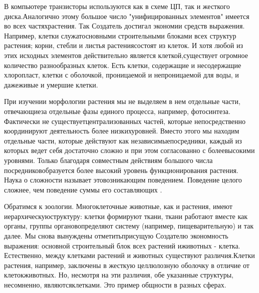 \documentclass[10pt]{article}
\begin{document}
В компьютере транзисторы используются как в схеме ЦП, так и жесткого диска.\linebreak Аналогично этому большое число "унифицированных элементов" имеется во всех частях\linebreak растения. Так Создатель достигал экономии средств выражения. Например, клетки служат\linebreak основными строительными блоками всех структур растения; корни, стебли и листья растения\linebreak состоят из клеток. И хотя любой из этих исходных элементов действительно является клеткой,\linebreak существует огромное количество разнообразных клеток. Есть клетки, содержащие и не\linebreak содержащие хлоропласт, клетки с оболочкой, проницаемой и непроницаемой для воды, и даже\linebreak живые и умершие клетки. 

При изучении морфологии растения мы не выделяем в нем отдельные части, отвечающие\linebreak за отдельные фазы единого процесса, например, фотосинтеза. Фактически не существует\linebreak централизованных частей, которые непосредственно координируют деятельность более низких\linebreak уровней. Вместо этого мы находим отдельные части, которые действуют как независимые\linebreak посредники, каждый из которых ведет себя достаточно сложно и при этом согласованно с более\linebreak высокими уровнями. Только благодаря совместным действиям большого числа посредников\linebreak образуется более высокий уровень функционирования растения. Наука о сложности называет это\linebreak возникающим поведением. Поведение целого сложнее, чем поведение суммы его составляющих \cite{Waldrop}. 

Обратимся к зоологии. Многоклеточные животные, как и растения, имеют иерархическую\linebreak структуру: клетки формируют ткани, ткани работают вместе как органы, группы органов\linebreak определяют систему (например, пищеварительную) и так далее. Мы снова вынуждены отметить\linebreak присущую Создателю экономность выражения: основной строительный блок всех растений и\linebreak животных - клетка. Естественно, между клетками растений и животных существуют различия.\linebreak Клетки растения, например, заключены в жесткую целлюлозную оболочку в отличие от клеток\linebreak животных. Но, несмотря на эти различия, обе указанные структуры, несомненно, являются\linebreak клетками. Это пример общности в разных сферах. 
\end{document}
